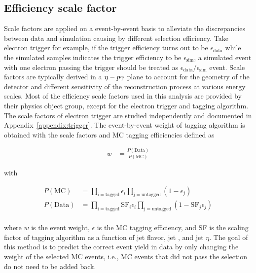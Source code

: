 \subsection{Efficiency scale factor}
Scale factors are applied on a event-by-event basis to alleviate the discrepancies between data and simulation causing by different selection efficiency.
Take electron trigger for example, if the trigger efficiency turns out to be $\epsilon_{\mathrm{data}}$ while the simulated samples indicates the trigger efficiency to be $\epsilon_{\mathrm{sim}}$, a simulated event with one electron passing the trigger should be treated as $\epsilon_{\mathrm{data}}/\epsilon_{\mathrm{sim}}$ event.
Scale factors are typically derived in a $\eta-p_{\mathrm{T}}$ plane to account for the geometry of the detector and different sensitivity of the reconstruction process at various energy scales.
Most of the efficiency scale factors used in this analysis are provided by their physics object group, except for the electron trigger and \PQb tagging algorithm.
The scale factors of electron trigger are studied independently and documented in Appendix~\ref{appendix:trigger}.
The event-by-event weight of \PQb tagging algorithm is obtained with the scale factors and MC \PQb tagging efficiencies defined as
\begin{linenomath}\begin{equation}\begin{aligned}\label{eq:data_btagsf}
    w &= \frac{P(\mathrm{Data})}{P(\mathrm{MC})}
\end{aligned}\end{equation}\end{linenomath}
with 
\begin{linenomath}\begin{equation}\begin{aligned}\label{eq:data_btageff}
    P(\mathrm{MC}) &= \prod_{\mathrm{i=tagged}} \epsilon_{i} \prod_{\mathrm{j=untagged}} (1-\epsilon_{j}) \\
    P(\mathrm{Data}) &= \prod_{\mathrm{i=tagged}} \mathrm{SF}_i\epsilon_{i} \prod_{\mathrm{j=untagged}} (1-\mathrm{SF}_j\epsilon_{j}) \\
\end{aligned}\end{equation}\end{linenomath}
where $w$ is the event weight, $\epsilon$ is the MC \PQb tagging efficiency, and SF is the scaling factor of \PQb tagging algorithm as a function of jet flavor, jet \PT, and jet $\eta$. 
The goal of this method is to predict the correct event yield in data by only changing the weight of the selected MC events, i.e., MC events that did not pass the selection do not need to be added back.
